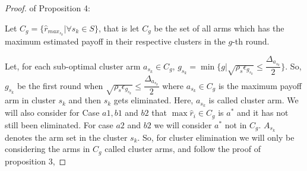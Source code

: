 \begin{proof} of Proposition 4:

Let $C_{g}=\lbrace \hat{r}_{max_{s_{k}}}| \forall s_{k}\in S \rbrace$, that is let $C_{g}$ be the set of all arms which has the maximum estimated payoff in their respective clusters in the $g$-th round.

Let, for each sub-optimal cluster arm $a_{s_{k}}\in C_{g}$, $g_{s_{k}}=\min{\lbrace g|\sqrt{\rho_{s}\epsilon_{g_{s_{k}}}}\leq \dfrac{\Delta_{a_{s_{k}}}}{2} \rbrace}$. So, $g_{s_{k}}$ be the first round when $\sqrt{\rho_{s}\epsilon_{g_{s_{k}}}}\leq \dfrac{\Delta_{a_{s_{k}}}}{2}$ where $a_{s_{k}}\in C_{g}$ is the maximum payoff arm in cluster $s_{k}$ and then $s_{k}$ gets eliminated. Here, $a_{s_{k}}$ is called cluster arm. We will also consider for Case $a1,b1 $ and $b2$  that $\max \hat{r}_{i}\in C_{g}$ is $a^{*}$ and it has not still been eliminated. For case $a2$ and $b2$ we will consider $a^{*}$ not in $C_{g}$. $A_{s_{k}}$ denotes the arm set in the cluster $s_{k}$. So, for cluster elimination we will only be considering the arms in $C_{g}$ called cluster arms, and follow the proof of proposition $3$,



\end{proof}
